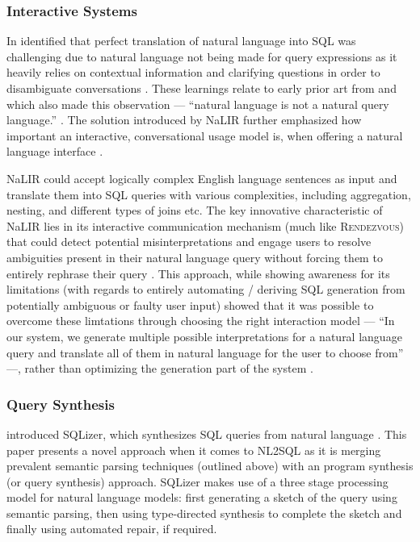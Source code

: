 \subsubsection{Interactive Systems}

In \citeyear{NALIR} \citeauthor*{NALIR} identified that perfect translation of natural language into SQL was challenging
due to natural language not being made for query expressions as it heavily relies on contextual information and clarifying
questions in order to disambiguate conversations \citep{NALIR}. These learnings relate to early prior art from 
\citeauthor{UnnaturalQueryLanguage} and \citeauthor{Rendezvous} which also made this observation — ``natural language
is not a natural query language.'' \citep{UnnaturalQueryLanguage}. The solution introduced by NaLIR further emphasized
how important an interactive, conversational usage model is, when offering a natural language interface \citep{NALIR}.

NaLIR could accept logically complex English language sentences as input and translate them into SQL queries with various 
complexities, including aggregation, nesting, and different types of joins etc. The key innovative characteristic of 
NaLIR lies in its interactive communication mechanism (much like \textsc{Rendezvous}) that could detect potential 
misinterpretations and engage users to resolve ambiguities present in their natural language query without forcing them
to entirely rephrase their query \cite{NALIR}. This approach, while showing awareness for its limitations (with regards
to entirely automating / deriving SQL generation from potentially ambiguous or faulty user input) showed that it was 
possible to overcome these limtations through choosing the right interaction model — ``In our system, we generate
multiple possible interpretations for a natural language query and translate all of them in natural language for the
user to choose from'' —, rather than optimizing the generation part of the system \cite{NALIR}.

\subsubsection{Query Synthesis}

\cite{SQLizer} introduced SQLizer, which synthesizes SQL queries from natural language \citep{SQLizer}. This paper
presents a novel approach when it comes to NL2SQL as it is merging prevalent semantic parsing techniques (outlined above)
with an program synthesis (or query synthesis) approach. SQLizer makes use of a three stage processing model for 
natural language models: first generating a sketch of the query using semantic parsing, then using type-directed
synthesis to complete the sketch and finally using automated repair, if required. 

